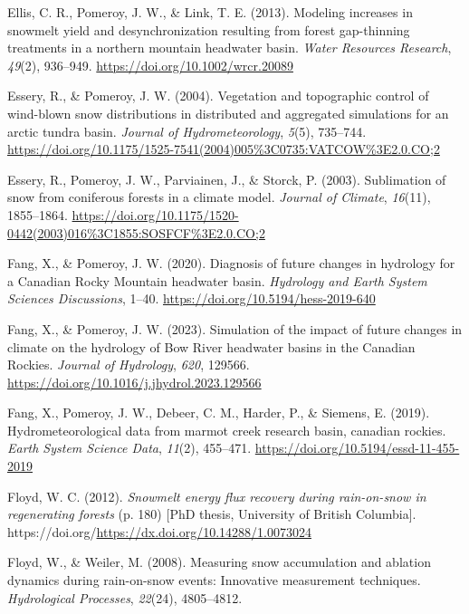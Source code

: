 \documentclass[
  letterpaper,
]{tex/uofsthesis-cs}
\newlength{\cslhangindent}
\newenvironment{CSLReferences}[2] %
 {\begin{list}{}{%
  \setlength{\itemindent}{0pt}
  \setlength{\leftmargin}{0pt}
  \setlength{\parsep}{0pt}
  \ifodd #1
   \setlength{\leftmargin}{\cslhangindent}
   \setlength{\itemindent}{-1\cslhangindent}
  \fi
  \setlength{\itemsep}{#2\baselineskip}}}
 {\end{list}}
\begin{document}
\begin{CSLReferences}{1}{0}
Ellis, C. R., Pomeroy, J. W., \& Link, T. E. (2013). Modeling increases
in snowmelt yield and desynchronization resulting from forest
gap-thinning treatments in a northern mountain headwater basin.
\emph{Water Resources Research}, \emph{49}(2), 936--949.
\url{https://doi.org/10.1002/wrcr.20089}

Essery, R., \& Pomeroy, J. W. (2004). Vegetation and topographic control
of wind-blown snow distributions in distributed and aggregated
simulations for an arctic tundra basin. \emph{Journal of
Hydrometeorology}, \emph{5}(5), 735--744.
\url{https://doi.org/10.1175/1525-7541(2004)005\%3C0735:VATCOW\%3E2.0.CO;2}

Essery, R., Pomeroy, J. W., Parviainen, J., \& Storck, P. (2003).
Sublimation of snow from coniferous forests in a climate model.
\emph{Journal of Climate}, \emph{16}(11), 1855--1864.
\url{https://doi.org/10.1175/1520-0442(2003)016\%3C1855:SOSFCF\%3E2.0.CO;2}

Fang, X., \& Pomeroy, J. W. (2020). Diagnosis of future changes in
hydrology for a {Canadian Rocky Mountain} headwater basin.
\emph{Hydrology and Earth System Sciences Discussions}, 1--40.
\url{https://doi.org/10.5194/hess-2019-640}

Fang, X., \& Pomeroy, J. W. (2023). Simulation of the impact of future
changes in climate on the hydrology of {Bow River} headwater basins in
the {Canadian Rockies}. \emph{Journal of Hydrology}, \emph{620}, 129566.
\url{https://doi.org/10.1016/j.jhydrol.2023.129566}

Fang, X., Pomeroy, J. W., Debeer, C. M., Harder, P., \& Siemens, E.
(2019). Hydrometeorological data from marmot creek research basin,
canadian rockies. \emph{Earth System Science Data}, \emph{11}(2),
455--471. \url{https://doi.org/10.5194/essd-11-455-2019}

Floyd, W. C. (2012). \emph{Snowmelt energy flux recovery during
rain-on-snow in regenerating forests} (p. 180) {[}PhD thesis, University
of British Columbia{]}.
https://doi.org/\url{https://dx.doi.org/10.14288/1.0073024}

Floyd, W., \& Weiler, M. (2008). Measuring snow accumulation and
ablation dynamics during rain-on-snow events: Innovative measurement
techniques. \emph{Hydrological Processes}, \emph{22}(24), 4805--4812.


\end{CSLReferences}
\end{document}
